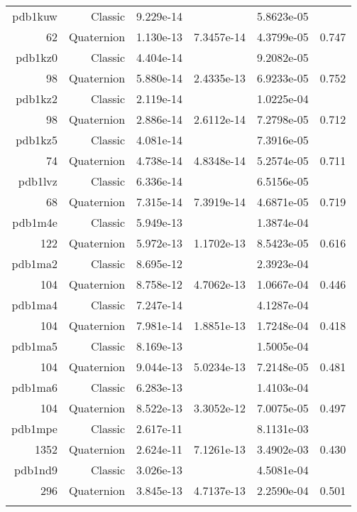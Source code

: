 \begin{xltabular}{\textwidth}{r|rS[table-format=1.3e+2]S[table-format=1.4e+2]S[table-format=1.4e+2]S[table-format=-1.3]}
pdb1kuw & Classic & 9.229e-14 &  & 5.8623e-05 & \\
62 & Quaternion & 1.130e-13 & 7.3457e-14 & 4.3799e-05 & 0.747\\  \addlinespace
pdb1kz0 & Classic & 4.404e-14 &  & 9.2082e-05 & \\
98 & Quaternion & 5.880e-14 & 2.4335e-13 & 6.9233e-05 & 0.752\\  \addlinespace
pdb1kz2 & Classic & 2.119e-14 &  & 1.0225e-04 & \\
98 & Quaternion & 2.886e-14 & 2.6112e-14 & 7.2798e-05 & 0.712\\  \addlinespace
pdb1kz5 & Classic & 4.081e-14 &  & 7.3916e-05 & \\
74 & Quaternion & 4.738e-14 & 4.8348e-14 & 5.2574e-05 & 0.711\\  \addlinespace
pdb1lvz & Classic & 6.336e-14 &  & 6.5156e-05 & \\
68 & Quaternion & 7.315e-14 & 7.3919e-14 & 4.6871e-05 & 0.719\\  \addlinespace
pdb1m4e & Classic & 5.949e-13 &  & 1.3874e-04 & \\
122 & Quaternion & 5.972e-13 & 1.1702e-13 & 8.5423e-05 & 0.616\\  \addlinespace
pdb1ma2 & Classic & 8.695e-12 &  & 2.3923e-04 & \\
104 & Quaternion & 8.758e-12 & 4.7062e-13 & 1.0667e-04 & 0.446\\  \addlinespace
pdb1ma4 & Classic & 7.247e-14 &  & 4.1287e-04 & \\
104 & Quaternion & 7.981e-14 & 1.8851e-13 & 1.7248e-04 & 0.418\\  \addlinespace
pdb1ma5 & Classic & 8.169e-13 &  & 1.5005e-04 & \\
104 & Quaternion & 9.044e-13 & 5.0234e-13 & 7.2148e-05 & 0.481\\  \addlinespace
pdb1ma6 & Classic & 6.283e-13 &  & 1.4103e-04 & \\
104 & Quaternion & 8.522e-13 & 3.3052e-12 & 7.0075e-05 & 0.497\\  \addlinespace
{\color{red} pdb1mpe } & Classic & 2.617e-11 &  & 8.1131e-03 & \\
1352 & Quaternion & 2.624e-11 & 7.1261e-13 & 3.4902e-03 & 0.430\\  \addlinespace
pdb1nd9 & Classic & 3.026e-13 &  & 4.5081e-04 & \\
296 & Quaternion & 3.845e-13 & 4.7137e-13 & 2.2590e-04 & 0.501\\  \addlinespace

\end{xltabular}
